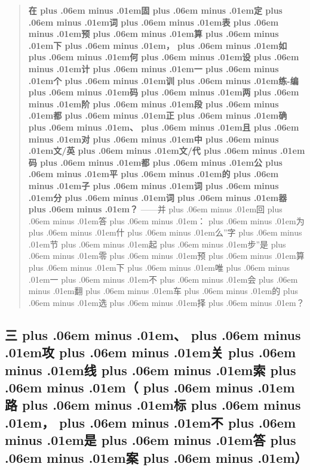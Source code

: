 \documentclass[
]{article}
\def\zh#1{{\zhfont #1}}
\def\zhglue{\hskip0pt plus .06em minus .01em}
\begin{document}
\begin{quote}
\textbf{\zh{在\zhglue 固\zhglue 定\zhglue 词\zhglue 表\zhglue 预\zhglue 算\zhglue 下\zhglue ，\zhglue 如\zhglue 何\zhglue 设\zhglue 计\zhglue 一\zhglue 个\zhglue 训\zhglue 练}-\zh{编\zhglue 码\zhglue 两\zhglue 阶\zhglue 段\zhglue 都\zhglue 正\zhglue 确\zhglue 、\zhglue 且\zhglue 对\zhglue 中\zhglue 文}/\zh{英\zhglue 文}/\zh{代\zhglue 码\zhglue 都\zhglue 公\zhglue 平\zhglue 的\zhglue 子\zhglue 词\zhglue 分\zhglue 词\zhglue 器\zhglue ？}} ------\zh{并\zhglue 回\zhglue 答\zhglue ：\zhglue 为\zhglue 什\zhglue 么}''\zh{字\zhglue 节\zhglue 起\zhglue 步}''\zh{是\zhglue 零\zhglue 预\zhglue 算\zhglue 下\zhglue 唯\zhglue 一\zhglue 不\zhglue 会\zhglue 翻\zhglue 车\zhglue 的\zhglue 选\zhglue 择\zhglue ？}
\end{quote}

\subsection{\zh{三\zhglue 、\zhglue 攻\zhglue 关\zhglue 线\zhglue 索\zhglue （\zhglue 路\zhglue 标\zhglue ，\zhglue 不\zhglue 是\zhglue 答\zhglue 案\zhglue ）}}\label{ux4e09ux653bux5173ux7ebfux7d22ux8defux6807ux4e0dux662fux7b54ux6848}
\end{document}
